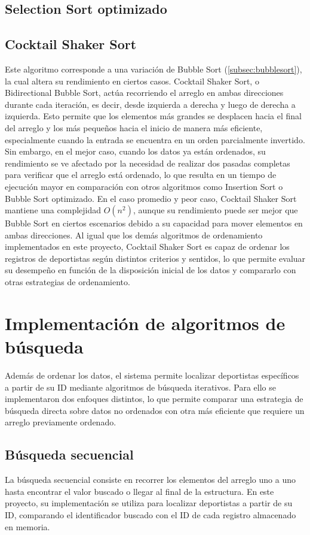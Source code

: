 \subsection{Selection Sort optimizado}

\subsection{Cocktail Shaker Sort}
Este algoritmo corresponde a una variación de Bubble Sort (\ref{subsec:bubblesort}), la cual altera su rendimiento en ciertos casos. Cocktail Shaker Sort, o Bidirectional Bubble Sort, actúa recorriendo el arreglo en ambas direcciones durante cada iteración, es decir, desde izquierda a derecha y luego de derecha a izquierda. Esto permite que los elementos más grandes se desplacen hacia el final del arreglo y los más pequeños hacia el inicio de manera más eficiente, especialmente cuando la entrada se encuentra en un orden parcialmente invertido. Sin embargo, en el mejor caso, cuando los datos ya están ordenados, su rendimiento se ve afectado por la necesidad de realizar dos pasadas completas para verificar que el arreglo está ordenado, lo que resulta en un tiempo de ejecución mayor en comparación con otros algoritmos como Insertion Sort o Bubble Sort optimizado. En el caso promedio y peor caso, Cocktail Shaker Sort mantiene una complejidad \(O(n^2)\), aunque su rendimiento puede ser mejor que Bubble Sort en ciertos escenarios debido a su capacidad para mover elementos en ambas direcciones.
Al igual que los demás algoritmos de ordenamiento implementados en este proyecto, Cocktail Shaker Sort es capaz de ordenar los registros de deportistas según distintos criterios y sentidos, lo que permite evaluar su desempeño en función de la disposición inicial de los datos y compararlo con otras estrategias de ordenamiento.

\section{Implementación de algoritmos de búsqueda}
Además de ordenar los datos, el sistema permite localizar deportistas específicos a partir de su ID mediante algoritmos de búsqueda iterativos. Para ello se implementaron dos enfoques distintos, lo que permite comparar una estrategia de búsqueda directa sobre datos no ordenados con otra más eficiente que requiere un arreglo previamente ordenado.

\subsection{Búsqueda secuencial}
La búsqueda secuencial consiste en recorrer los elementos del arreglo uno a uno hasta encontrar el valor buscado o llegar al final de la estructura. En este proyecto, su implementación se utiliza para localizar deportistas a partir de su ID, comparando el identificador buscado con el ID de cada registro almacenado en memoria.

